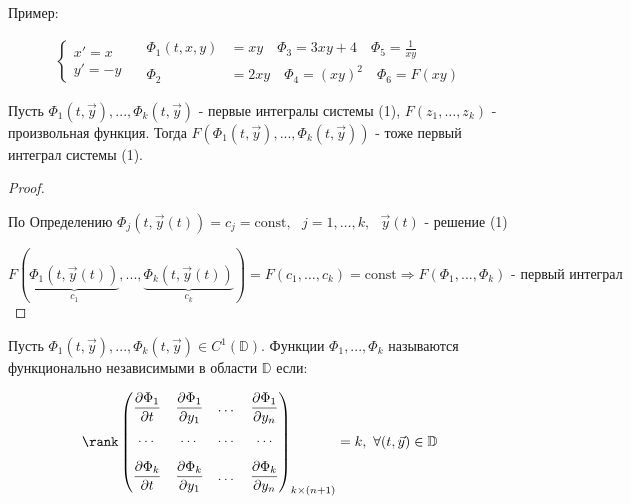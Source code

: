 \documentclass[12pt, a4paper]{report}
\begin{document}
Пример: 

\[ \begin{cases}
x ' = x \\ 
y ' = - y 
\end{cases} \quad  \begin{aligned}
    \Phi_1 (t,x,y ) &= xy  \quad  \Phi_3 = 3xy + 4 \quad  \Phi_5 = \displaystyle \frac{1}{xy }  \\ 
    \Phi_2 &= 2 xy \quad  \Phi_4=  (xy )^2 \quad  \Phi_6 = F(xy)
\end{aligned}\] 

\begin{theorem}
    Пусть \( \Phi_1 (t, \vec{ y}  ), ..., \Phi_k(t, \vec{ y} ) \) - первые интегралы системы (1), \( F(z_1, \ldots, z_k) \) - произвольная функция. Тогда \( F(\Phi_1 (t,\vec{ y} ), ..., \Phi_k (t , \vec{y} )) \) - тоже первый интеграл системы (1).
\end{theorem}

\begin{proof} \(  \) 

    По Определению \(  \Phi_j (t,\vec{ y} (t )) = c_j = \mathrm{const}  , \text{ }  j = 1, \ldots, k , \text{ }  \vec{ y } (t )\) - решение (1)

    \[ F(\underbrace{ \Phi_1 (t, \vec{ y} (t ))}_{c_1}, ..., \underbrace{\Phi_k (t, \vec{ y} (t ))}_{c_k}) = F(c_1, \ldots, c_k ) = \mathrm{const } \Rightarrow F(\Phi_1 ,..., \Phi_k) \text{ - первый интеграл}  \] 

\end{proof}

\begin{definition}
    Пусть \( \Phi_1(t, \vec{ y} ) ,... , \Phi_k (t, \vec{y } ) \in  C^1 (\mathbb{D}) \). Функции \( \Phi_1 ,..., \Phi_k  \) называются функционально независимыми в области \( \mathbb{D} \) если: 

    \[ \rank \begin{pmatrix}
    \displaystyle \frac{\partial \Phi_1 }{\partial  t }  & \displaystyle \frac{\partial  \Phi_1 }{\partial  y_1 }  & \dots & \displaystyle  \frac{\partial  \Phi_1 }{\partial y_n} \\[10pt]
    \dots & \dots& \dots &\dots \\[10pt]
    \displaystyle \frac{\partial  \Phi_k}{\partial t}  & \displaystyle  \frac{\partial  \Phi_k }{\partial y_1}  & \dots & \displaystyle  \frac{\partial  \Phi_k }{\partial  y_n} 
    \end{pmatrix} _{k \times  (n+1)}  =k  ,\text{ }  \forall  (t, \vec{ y}  )\in  \mathbb{D} \] 
\end{definition}
\end{document}
